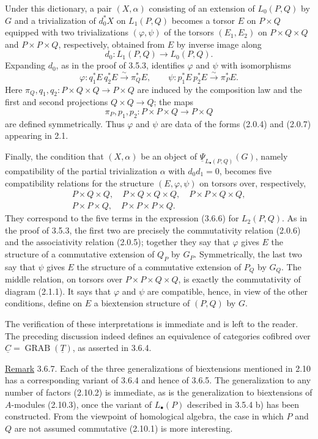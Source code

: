 Under this dictionary, a pair $(X,\alpha)$ consisting of an
extension of $L_0(P,Q)$ by $G$ and a trivialization of
$d_0^*X$ on $L_1(P,Q)$ becomes a torsor $E$ on $P\times Q$ equipped
with two trivializations $(\varphi,\psi)$ of the torsors
$(E_1,E_2)$ on $P\times Q\times Q$ and
$P\times P\times Q$, respectively, obtained from $E$ by inverse
image along
\[
 d_0:L_1(P,Q)\longrightarrow L_0(P,Q).
\]
Expanding $d_0$, as in the proof of 3.5.3, identifies
$\varphi$ and $\psi$ with isomorphisms
\[
 \varphi:q_1^*E\,q_2^*E\xrightarrow{\sim}\pi_Q^*E,
 \qquad
 \psi:p_1^*E\,p_2^*E\xrightarrow{\sim}\pi_P^*E.
\]
Here $\pi_Q,q_1,q_2:P\times Q\times Q\longrightarrow P\times Q$
are induced by the composition law and the first and second
projections $Q\times Q\longrightarrow Q$; the maps
\[
 \pi_P,p_1,p_2:P\times P\times Q\longrightarrow P\times Q
\]
are defined symmetrically.  Thus $\varphi$ and $\psi$ are data of
the forms (2.0.4) and (2.0.7) appearing in 2.1.

Finally, the condition that $(X,\alpha)$ be an object of
$\underline\Psi_{L_\bullet(P,Q)}(G)$, namely compatibility of the
partial trivialization $\alpha$ with $d_0d_1=0$, becomes five
compatibility relations for the structure $(E,\varphi,\psi)$ on
torsors over, respectively,
\[
\begin{gathered}
 P\times Q\times Q,\quad
 P\times Q\times Q\times Q,\quad
 P\times P\times Q\times Q,\\
 P\times P\times Q,\quad
 P\times P\times P\times Q.
\end{gathered}
\]
They correspond to the five terms in the expression (3.6.6) for
$L_2(P,Q)$.  As in the proof of 3.5.3, the first two are precisely
the commutativity relation (2.0.6) and the associativity relation
(2.0.5); together they say that $\varphi$ gives $E$ the structure
of a commutative extension of $Q_P$ by $G_P$.  Symmetrically, the
last two say that $\psi$ gives $E$ the structure of a commutative
extension of $P_Q$ by $G_Q$.  The middle relation, on torsors over
$P\times P\times Q\times Q$, is exactly the commutativity of
diagram (2.1.1).  It says that $\varphi$ and $\psi$ are compatible,
hence, in view of the other conditions, define on $E$ a
biextension structure of $(P,Q)$ by $G$.

The verification of these interpretations is immediate and is left
to the reader.  The preceding discussion indeed defines an
equivalence of categories cofibred over
$\underline C=\operatorname{GRAB}(\underline T)$, as asserted in
3.6.4.

\underline{Remark} 3.6.7. Each of the three generalizations of
biextensions mentioned in 2.10 has a corresponding variant of 3.6.4
and hence of 3.6.5.  The generalization to any number of factors
(2.10.2) is immediate, as is the generalization to biextensions of
$A$-modules (2.10.3), once the variant of $L_\bullet(P)$ described
in 3.5.4 b) has been constructed.  From the viewpoint of
homological algebra, the case in which $P$ and $Q$ are not assumed
commutative (2.10.1) is more interesting.


